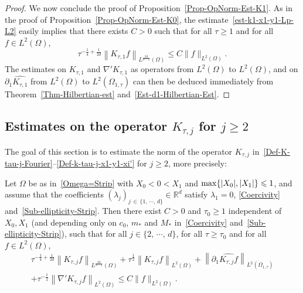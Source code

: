 \documentclass[AHL,Unicode,longabstracts]{cedram}
\newcommand*\R{\mathbb{R}}
\renewcommand{\leq}{\leqslant}
\renewcommand{\geq}{\geqslant}
\begin{document}
\begin{proof}
We now conclude the proof of Proposition~\ref{Prop-OpNorm-Est-K1}. As in the proof of Proposition~\ref{Prop-OpNorm-Est-K0}, the estimate~\eqref{est-k1-x1-y1-Lp-L2} easily implies that there exists $C>0$ such that for all $\tau \geq 1$ and for all $f \in L^2(\Omega)$,
\begin{equation*}
\tau^{-\frac{1}{4}+\frac{1}{2d}} \left\| K_{\tau,1} f\right\|_{L^{\frac{2d}{d-2}}(\Omega)}
\leq C \| f \|_{L^2(\Omega)}.
\end{equation*}
The estimates on $K_{\tau,1}$ and $\nabla' K_{\tau,1}$ as operators from $L^2(\Omega)$ to $L^2(\Omega)$, and on $\partial_1\widehat { K_{\tau,1}}$ from $L^2(\Omega)$ to $L^2(\Omega_{1, \tau})$ can then be deduced immediately from Theorem~\ref{Thm-Hilbertian-est} and~\eqref{Est-d1-Hilbertian-Est}.
\end{proof}

\subsection{Estimates on the operator \texorpdfstring{$K_{\tau,j}$}{K tau,j} for \texorpdfstring{$j \geq 2$}{j >= 2}}


The goal of this section is to estimate the norm of the operator $K_{\tau, j}$ in~\eqref{Def-K-tau-j-Fourier}--\eqref{Def-k-tau-j-x1-y1-xi'} for $j \geq 2$, more precisely:

\begin{prop}\label{Prop-OpNorm-Est-Kj}
Let $\Omega$ be as in~\eqref{Omega=Strip} with $X_0 \! <\! 0\! <\! X_1$ and $\max\{|X_0|, |X_1| \}\linebreak \leq 1$, and assume that the coefficients $(\lambda_j)_{j\,\in\,\{1,\,\cdots,\,d\}} \in \R^d$ satisfy $\lambda_1 = 0$, \eqref{Coercivity} and~\eqref{Sub-ellipticity-Strip}. Then there exist $C>0$ and $\tau_0 \geq 1$ independent of $X_0, X_1$ (and depending only on $c_0$, $m_*$ and $M_*$ in~\eqref{Coercivity} and~\eqref{Sub-ellipticity-Strip}), such that for all $j \in \{2,\,\cdots,\,d\}$, for all $\tau \geq \tau_0$ and for all $f \in L^2(\Omega)$,
\begin{multline*}
\tau^{-\frac{1}{4}+\frac{1}{2d}} \left\| K_{\tau,j} f\right\|_{L^{\frac{2d}{d-2}}(\Omega)} +
\tau^{\frac{1}{2}}\left\| K_{\tau,j} f\right\|_{L^{2}(\Omega)} +
\left\| \partial_1 \widehat{ K_{\tau,j} f}\right\|_{L^2(\Omega_{1, \tau})} \\ +
\tau^{-\frac{1}{2}} \left\| \nabla' K_{\tau,j} f\right\|_{L^2(\Omega)}
\leq C \| f \|_{L^2(\Omega)}.
\end{multline*}
\end{prop}
\end{document}
